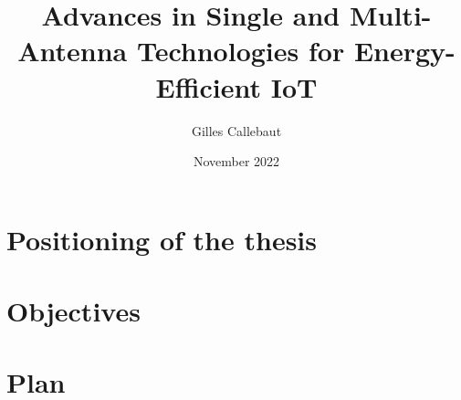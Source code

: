 \documentclass{article}
\title{Advances in Single and Multi-Antenna Technologies for Energy-Efficient IoT}
\author{Gilles Callebaut}
\date{November 2022}
\begin{document}
\maketitle

\section*{Positioning of the thesis}
\lipsum[1-2]

\section*{Objectives}
\lipsum[3-3]

\section*{Plan}
\lipsum[4-4]
\end{document}
